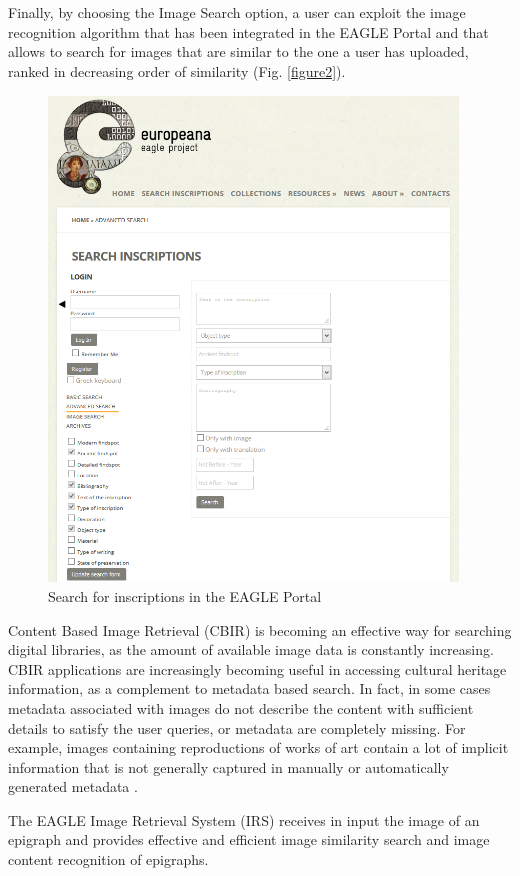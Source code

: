 \documentclass[amsthm,ebook]{saparticle}
\begin{document}
Finally, by choosing the Image Search option, a user can exploit the image recognition algorithm that has been
integrated in the EAGLE Portal and that allows to search for images that are similar to the one a user has uploaded,
ranked in decreasing order of similarity (Fig. \ref{figure2}).

\begin{figure}[!bp]
\centering
 \includegraphics[width=10.874cm,height=12.885cm]{EAGLE2016submissionXX-img001.png} 
\caption{Search for inscriptions in the EAGLE Portal}
\label{fig:figure1}
\end{figure}

Content Based Image Retrieval (CBIR) is becoming an effective way for searching digital libraries, as the amount of
available image data is constantly increasing. CBIR applications are increasingly becoming useful in accessing cultural
heritage information, as a complement to metadata based search. In fact, in some cases metadata associated with images
do not describe the content with sufficient details to satisfy the user queries, or metadata are completely missing.
For example, images containing reproductions of works of art contain a lot of implicit information that is not
generally captured in manually or automatically generated metadata \citep{amato_aim_2013}.

The EAGLE Image Retrieval System (IRS) receives in input the image of an epigraph and provides effective and efficient
image similarity search and image content recognition of epigraphs.
\end{document}
